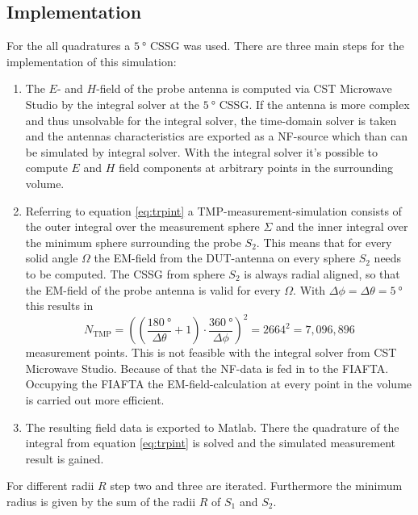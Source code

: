 \subsection{Implementation}

For the all quadratures a $\SI{5}{\degree}$ \ac{CSSG} was used. There are three main steps for the implementation of this simulation:

\begin{enumerate}
\item The $E$- and $H$-field of the probe antenna is computed via CST Microwave Studio\texttrademark{} by the integral solver at the $\SI{5}{\degree}$ \ac{CSSG}. If the antenna is more complex and thus unsolvable for the integral solver, the time-domain solver is taken and the antennas characteristics are exported as a \ac{NF}-source which than can be simulated by integral solver. With the integral solver it's possible to compute $E$ and $H$ field components at arbitrary points in the surrounding volume.
\item Referring to equation \ref{eq:trpint} a \ac{TMP}-measurement-simulation consists of the outer integral over the measurement sphere $\Sigma$ and the inner integral over the minimum sphere surrounding the probe $S_2$. This means that for every solid angle $\Omega$ the \ac{EM}-field from the \ac{DUT}-antenna on every sphere $S_2$ needs to be computed. The \ac{CSSG} from sphere $S_2$ is always radial aligned, so that the \ac{EM}-field of the probe antenna is valid for every $\Omega$. With $\Delta\phi=\Delta\theta=\SI{5}{\degree}$ this results in
\begin{equation}
N_\text{TMP}=\left(\left(\frac{\SI{180}{\degree}}{\Delta\theta}+1\right)\cdot\frac{\SI{360}{\degree}}{\Delta\phi}\right)^2=2664^2=7,096,896
\end{equation}
measurement points. This is not feasible with the integral solver from CST Microwave Studio\texttrademark{}. Because of that the \ac{NF}-data is fed in to the \ac{FIAFTA}. Occupying the \ac{FIAFTA} the \ac{EM}-field-calculation at every point in the volume is carried out more efficient.\cite{mypaper} \cite{fiafta}
\item The resulting field data is exported to Matlab\texttrademark{}. There the quadrature of the integral from equation \ref{eq:trpint} is solved and the simulated measurement result is gained.
\end{enumerate} 

For different radii $R$ step two and three are iterated. Furthermore the minimum radius is given by the sum of the radii $R$ of $S_1$ and $S_2$.

